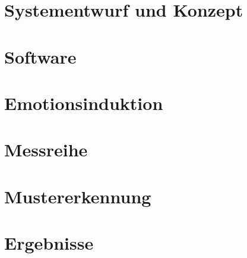 

\section{Systementwurf und Konzept} \label{systementwurf-1}



\newpage
\section{Software} \label{realisierung-1}



\newpage
\section{Emotionsinduktion} \label{emotionsinduktion-1}



\newpage
\section{Messreihe} \label{messreihe-1}



\newpage
\section{Mustererkennung} \label{mustererkennung-1}


\newpage
\section{Ergebnisse} \label{ergenisse-1}

